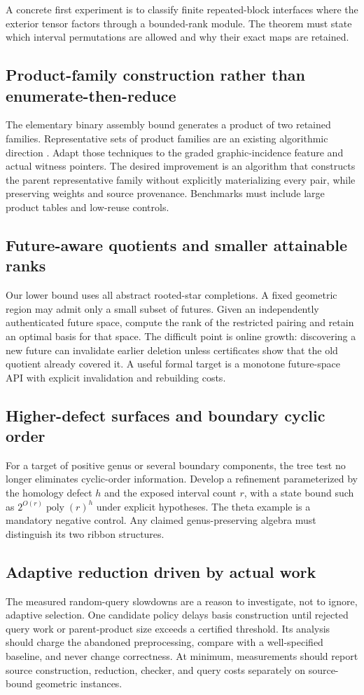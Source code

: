 \documentclass[11pt,a4paper]{article}
\theoremstyle{remark}\newtheorem{remark}[theorem]{Remark}
\newcommand{\poly}{\operatorname{poly}}
\begin{document}
A concrete first experiment is to classify finite repeated-block interfaces where the exterior tensor factors through a bounded-rank module. The theorem must state which interval permutations are allowed and why their exact maps are retained.

\subsection{Product-family construction rather than enumerate-then-reduce}
The elementary binary assembly bound generates a product of two retained families. Representative sets of product families are an existing algorithmic direction \cite{product}. Adapt those techniques to the graded graphic-incidence feature and actual witness pointers. The desired improvement is an algorithm that constructs the parent representative family without explicitly materializing every pair, while preserving weights and source provenance. Benchmarks must include large product tables and low-reuse controls.

\subsection{Future-aware quotients and smaller attainable ranks}
Our lower bound uses all abstract rooted-star completions. A fixed geometric region may admit only a small subset of futures. Given an independently authenticated future space, compute the rank of the restricted pairing and retain an optimal basis for that space. The difficult point is online growth: discovering a new future can invalidate earlier deletion unless certificates show that the old quotient already covered it. A useful formal target is a monotone future-space API with explicit invalidation and rebuilding costs.

\subsection{Higher-defect surfaces and boundary cyclic order}
For a target of positive genus or several boundary components, the tree test no longer eliminates cyclic-order information. Develop a refinement parameterized by the homology defect $h$ and the exposed interval count $r$, with a state bound such as $2^{O(r)}\poly(r)^h$ under explicit hypotheses. The theta example is a mandatory negative control. Any claimed genus-preserving algebra must distinguish its two ribbon structures.

\subsection{Adaptive reduction driven by actual work}
The measured random-query slowdowns are a reason to investigate, not to ignore, adaptive selection. One candidate policy delays basis construction until rejected query work or parent-product size exceeds a certified threshold. Its analysis should charge the abandoned preprocessing, compare with a well-specified baseline, and never change correctness. At minimum, measurements should report source construction, reduction, checker, and query costs separately on source-bound geometric instances.
\end{document}
